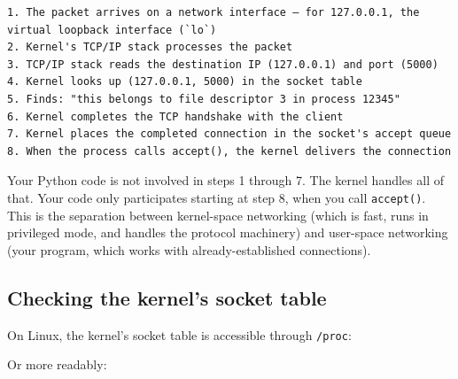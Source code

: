 \begin{outputbox}[short]
\begin{Verbatim}[fontsize=\codesize, breaklines, breakanywhere, breaksymbolleft={\tiny\textcolor{muted}{$\hookrightarrow$}}]
1. The packet arrives on a network interface — for 127.0.0.1, the virtual loopback interface (`lo`)
2. Kernel's TCP/IP stack processes the packet
3. TCP/IP stack reads the destination IP (127.0.0.1) and port (5000)
4. Kernel looks up (127.0.0.1, 5000) in the socket table
5. Finds: "this belongs to file descriptor 3 in process 12345"
6. Kernel completes the TCP handshake with the client
7. Kernel places the completed connection in the socket's accept queue
8. When the process calls accept(), the kernel delivers the connection
\end{Verbatim}
\end{outputbox}

\noindent{}Your Python code is not involved in steps 1 through 7. The kernel handles all of that. Your code only participates starting at step 8, when you call \texttt{accept()}. This is the separation between kernel-space networking (which is fast, runs in privileged mode, and handles the protocol machinery) and user-space networking (your program, which works with already-established connections).

\subsection*{Checking the kernel's socket table}\label{03-network-capability:checking-the-kernels-socket-table}

On Linux, the kernel's socket table is accessible through \texttt{/proc}:

\begin{codebox}[short]

\begin{Shaded}
\begin{Highlighting}[]
\end{Highlighting}
\end{Shaded}

\end{codebox}

\noindent{}Or more readably:

\begin{codebox}[short]

\begin{Shaded}
\begin{Highlighting}[]
  \KeywordTok{|} 
\end{Highlighting}
\end{Shaded}

\end{codebox}

